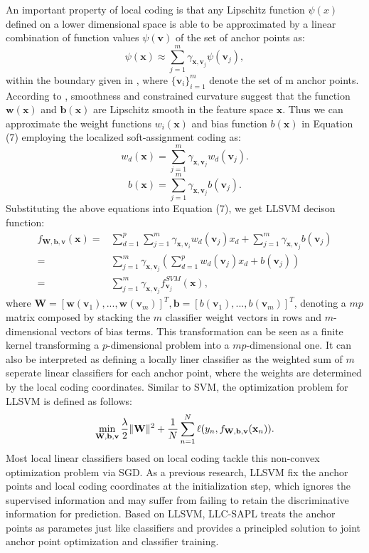 \documentclass{llncs}
\DeclarePairedDelimiter\norm{\lVert}{\rVert}
\def \x {\mathbf{x}}
\def \w {\mathbf{w}}
\def \W {\mathbf{W}}
\def \v {\mathbf{v}}
\def \b {\mathbf{b}}
\begin{document}
	An important property of local coding is that any Lipschitz function $\psi(x)$ defined on a lower dimensional space is able to be approximated by a linear combination of function values $\psi(\v)$ of the set of anchor points as:
	\begin{equation}
	\psi(\x)\approx \sum_{j=1}^{m}\gamma_{\x,\v_j}\psi(\v_j),
	\end{equation}
	within the boundary given in \cite{12}, where $\{\v_i\}_{i=1}^m$ denote the set of m anchor points. According to \cite{2} \cite{12}, smoothness and constrained curvature suggest that the function $\w(\x)$ and $\b(\x)$ are Lipschitz smooth in the feature space $\x$.
	Thus we can approximate the weight functions $w_i(\x)$ and bias function $b(\x)$ in Equation (7) employing the localized soft-assignment coding as:
	\begin{equation}
	w_d(\x) = \sum_{j=1}^m\gamma_{\x,\v_j}w_d(\v_j).
	\end{equation}
	\begin{equation}
	b(\x) = \sum_{j=1}^m\gamma_{\x,\v_j}b(\v_j).
	\end{equation}
	Substituting the above equations into Equation (7), we get LLSVM decison function:
	\begin{equation}
	\begin{split}
	f_{\W,\b,\v}(\x){}=& \sum_{d=1}^p\sum_{j=1}^m\gamma_{\x,\v_i}w_d(\v_j)x_d + \sum_{j=1}^m\gamma_{\x,\v_j}b(\v_j) \\
	{}=&\sum_{j=1}^m\gamma_{\x,\v_j}(\sum_{d=1}^p w_d(\v_j)x_d+b(\v_j)) \\
	{}=&\sum_{j=1}^m\gamma_{\x,\v_j}f^{SVM}_{\v_j}(\x),
	\end{split}
	\end{equation}
	where $\W = [\w(\v_1),...,\w(\v_m)]^T, \b=[b(\v_1),...,b(\v_m)]^T$, denoting a $mp$ matrix composed by stacking the $m$ classifier weight vectors in rows and $m$-dimensional vectors of bias terms. This transformation can be seen as a finite kernel transforming a $p$-dimensional problem into a $mp$-dimensional one. It can also be interpreted as defining a locally liner classifier as the weighted sum of $m$ seperate linear classifiers for each anchor point, where the weights are determined by the local coding coordinates. Similar to SVM, the optimization problem for LLSVM is defined as follows:
	\begin{equation}
	\min_{\W,\b,\v} \frac{\lambda}{2}\norm{\W}^2 + \frac{1}{N}\sum_{n=1}^{N}\ell(y_n,f_{\W,\b,\v}(\x_n)).
	\end{equation}
	Most local linear classifiers based on local coding  \cite{2} \cite{4} tackle this non-convex optimization problem via SGD. As a previous research, LLSVM \cite{2} fix the anchor points and local coding coordinates at the initialization step, which ignores the supervised information and may suffer from failing to retain the discriminative information for prediction. Based on LLSVM, LLC-SAPL \cite{4} treats the anchor points as parametes just like classifiers and provides a principled solution to joint anchor point optimization and classifier training.
	
\end{document}
